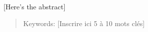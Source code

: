 \abstract
\begin{singlespace}    

  [Here's the abstract]    

  \begin{quote} 
    Keywords: [Inscrire ici 5 à 10 mots clés]
  \end{quote}
\end{singlespace}
\cleardoublepage





\tabledesmatieres


\listedestableaux



\listedesfigures












\cleardoublepage